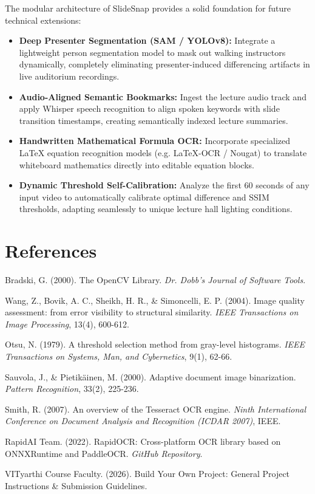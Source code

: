 \documentclass[10pt,a4paper]{article}
\begin{document}
The modular architecture of SlideSnap provides a solid foundation for future technical extensions:
\begin{itemize}[leftmargin=6mm, itemsep=1pt, topsep=2pt]
  \item \textbf{Deep Presenter Segmentation (SAM / YOLOv8):} Integrate a lightweight person segmentation model to mask out walking instructors dynamically, completely eliminating presenter-induced differencing artifacts in live auditorium recordings.
  \item \textbf{Audio-Aligned Semantic Bookmarks:} Ingest the lecture audio track and apply Whisper speech recognition to align spoken keywords with slide transition timestamps, creating semantically indexed lecture summaries.
  \item \textbf{Handwritten Mathematical Formula OCR:} Incorporate specialized LaTeX equation recognition models (e.g. LaTeX-OCR / Nougat) to translate whiteboard mathematics directly into editable equation blocks.
  \item \textbf{Dynamic Threshold Self-Calibration:} Analyze the first 60 seconds of any input video to automatically calibrate optimal difference and SSIM thresholds, adapting seamlessly to unique lecture hall lighting conditions.
\end{itemize}

\section{References}

\begin{enumerate}[label={[\arabic*]}, leftmargin=8mm, itemsep=2pt, topsep=2pt]
  \item Bradski, G. (2000). The OpenCV Library. \textit{Dr. Dobb's Journal of Software Tools}.
  \item Wang, Z., Bovik, A. C., Sheikh, H. R., \& Simoncelli, E. P. (2004). Image quality assessment: from error visibility to structural similarity. \textit{IEEE Transactions on Image Processing}, 13(4), 600-612.
  \item Otsu, N. (1979). A threshold selection method from gray-level histograms. \textit{IEEE Transactions on Systems, Man, and Cybernetics}, 9(1), 62-66.
  \item Sauvola, J., \& Pietik{\"a}inen, M. (2000). Adaptive document image binarization. \textit{Pattern Recognition}, 33(2), 225-236.
  \item Smith, R. (2007). An overview of the Tesseract OCR engine. \textit{Ninth International Conference on Document Analysis and Recognition (ICDAR 2007)}, IEEE.
  \item RapidAI Team. (2022). RapidOCR: Cross-platform OCR library based on ONNXRuntime and PaddleOCR. \textit{GitHub Repository}.
  \item VITyarthi Course Faculty. (2026). Build Your Own Project: General Project Instructions \& Submission Guidelines.
\end{enumerate}
\end{document}
